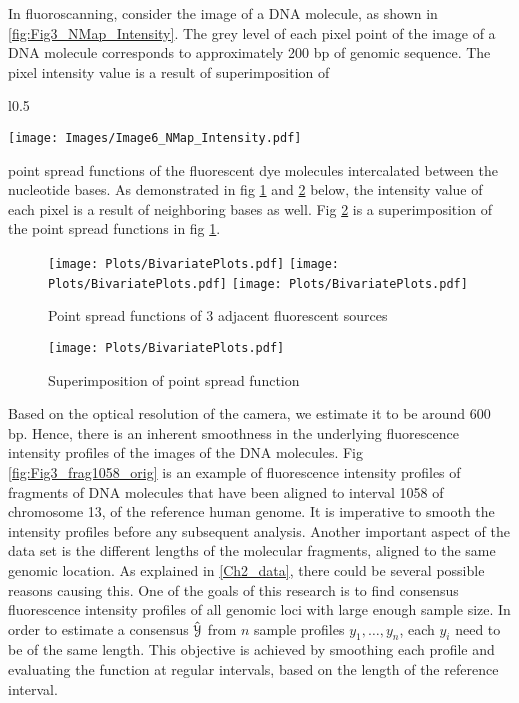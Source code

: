 In fluoroscanning, consider the image of a DNA molecule, as shown in \ref{fig:Fig3_NMap_Intensity}. The grey level of each pixel point of the image of a DNA molecule corresponds to approximately 200 bp of genomic sequence. The pixel intensity value is a result of superimposition of 
\begin{wrapfigure}{l}{0.5\textwidth}
\begin{center}
\texttt{[image: Images/Image6\_NMap\_Intensity.pdf]}
\end{center}
\caption{Image of DNA molecule}
\label{fig:Fig3_NMap_Intensity}
\end{wrapfigure}
point spread functions of the fluorescent dye molecules intercalated between the nucleotide bases. As demonstrated in fig \ref{fig:Fig3_Bivariate1} and \ref{fig:Fig3_Bivariate2} below, the intensity value of each pixel is a result of neighboring bases as well. Fig \ref{fig:Fig3_Bivariate2} is a superimposition of the point spread functions in fig \ref{fig:Fig3_Bivariate1}.  

\begin{figure}[H]
\begin{center}
\texttt{[image: Plots/BivariatePlots.pdf]}
\texttt{[image: Plots/BivariatePlots.pdf]}
\texttt{[image: Plots/BivariatePlots.pdf]}
\end{center}
\caption{Point spread functions of 3 adjacent fluorescent sources}
\label{fig:Fig3_Bivariate1}
\end{figure}

\begin{figure}[H]
\begin{center}
\texttt{[image: Plots/BivariatePlots.pdf]}
\end{center}
\caption{Superimposition of point spread function}
\label{fig:Fig3_Bivariate2}
\end{figure}
Based on the optical resolution of the camera, we estimate it to be around 600 bp. Hence, there is an inherent smoothness in the underlying fluorescence intensity profiles of the images of the DNA molecules. Fig \ref{fig:Fig3_frag1058_orig} is an example of fluorescence intensity profiles of fragments of DNA molecules that have been aligned to interval 1058 of chromosome 13, of the reference human genome. It is imperative to smooth the intensity profiles before any subsequent analysis. Another important aspect of the data set is the different lengths of the molecular fragments, aligned to the same genomic location. As explained in \ref{Ch2_data}, there could be several possible reasons causing this. One of the goals of this research is to find consensus fluorescence intensity profiles of all genomic loci with large enough sample size. In order to estimate a consensus $\hat{\mathcal{Y}}$ from $n$ sample profiles $y_1, \dots, y_n$, each $y_i$ need to be of the same length. This objective is achieved by smoothing each profile and evaluating the function at regular intervals, based on the length of the reference interval. 

